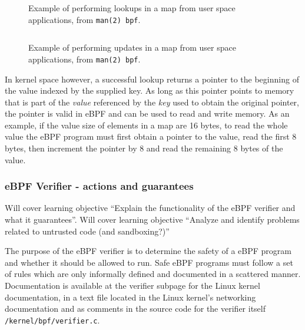 \begin{figure}[htbp!]
  \centering
  \inputminted[linenos]{C}{snippets/map_lookup_struct.c}
  \caption{Example of performing lookups in a map from user space applications, from \texttt{man(2) bpf}.}
  \label{snip:map_lookup}
\end{figure}

\begin{figure}[htbp!]
  \centering
  \inputminted[linenos]{C}{snippets/map_update_struct.c}
  \caption{Example of performing updates in a map from user space applications, from \texttt{man(2) bpf}.}
  \label{snip:map_update}
\end{figure}

In kernel space however, a successful lookup returns a pointer to the beginning of the value indexed by the supplied key. As long as this pointer points to memory that is part of the \textit{value} referenced by the \textit{key} used to obtain the original pointer, the pointer is valid in eBPF and can be used to read and write memory. As an example, if the value size of elements in a map are 16 bytes, to read the whole value the eBPF program must first obtain a pointer to the value, read the first 8 bytes, then increment the pointer by 8 and read the remaining 8 bytes of the value.


\subsubsection{eBPF Verifier - actions and guarantees}
Will cover learning objective ``Explain the functionality of the eBPF verifier and what it guarantees''.
Will cover learning objective ``Analyze and identify problems related to untrusted code (and sandboxing?)''


The purpose of the eBPF verifier is to determine the safety of a eBPF program and whether it should be allowed to run.
Safe eBPF programs must follow a set of rules which are only informally defined and documented in a scattered manner. Documentation is available at the verifier subpage for the Linux kernel documentation\cite{ebpf-verifier}, in a text file located in the Linux kernel's networking documentation\cite{ebpf-filter} and as comments in the source code for the verifier itself
\texttt{/kernel/bpf/verifier.c}\cite{ebpf-verifier-source}. 

